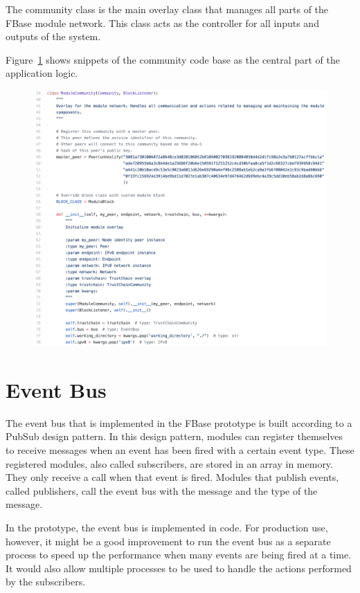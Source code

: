 The community class is the main overlay class that manages all parts of the FBase module network. This class acts as the controller for all inputs and outputs of the system.

Figure~\ref{fig:community-code} shows snippets of the community code base as the central part of the application logic.

\begin{figure}[h!]
	\centering
	\includegraphics[width=\textwidth]{images/implementation-code-community-class.png}
	\caption{\label{fig:community-code}}
\end{figure}

\section{Event Bus}

The event bus that is implemented in the FBase prototype is built according to a PubSub design pattern. In this design pattern, modules can register themselves to receive messages when an event has been fired with a certain event type. These registered modules, also called subscribers, are stored in an array in memory. They only receive a call when that event is fired. Modules that publish events, called publishers, call the event bus with the message and the type of the message.

In the prototype, the event bus is implemented in code. For production use, however, it might be a good improvement to run the event bus as a separate process to speed up the performance when many events are being fired at a time. It would also allow multiple processes to be used to handle the actions performed by the subscribers. 

